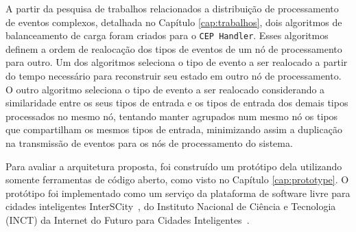 
A partir da pesquisa de trabalhos relacionados a distribuição de processamento de eventos complexos, detalhada no Capítulo \ref{cap:trabalhos}, dois algoritmos de balanceamento de carga foram criados para o \texttt{CEP Handler}. Esses algoritmos definem a ordem de realocação dos tipos de eventos de um nó de processamento para outro. Um dos algoritmos seleciona o tipo de evento a ser realocado a partir do tempo necessário para reconstruir seu estado em outro nó de processamento. O outro algoritmo seleciona o tipo de evento a ser realocado considerando a similaridade entre os seus tipos de entrada e os tipos de entrada dos demais tipos processados no mesmo nó, tentando manter agrupados num mesmo nó os tipos que compartilham os mesmos tipos de entrada, minimizando assim a duplicação na transmissão de eventos para os nós de processamento do sistema.

Para avaliar a arquitetura proposta, foi construído um protótipo dela utilizando somente ferramentas de código aberto, como visto no Capítulo \ref{cap:prototype}. O protótipo foi implementado como um serviço da plataforma de software livre para cidades inteligentes InterSCity~\citep{del2019design}, do Instituto Nacional de Ciência e Tecnologia (INCT) da Internet do Futuro para Cidades Inteligentes~\citep{Interscitysite}.




